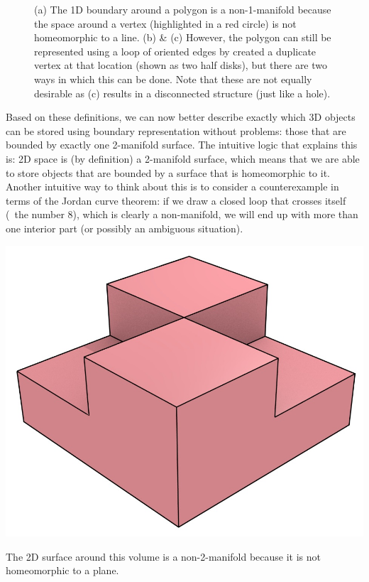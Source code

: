 \begin{figure}
\begin{subfigure}[b]{0.3\linewidth}
\caption{}%
\label{subfig:nonmanifold-2}
\end{subfigure}
\caption{(a) The 1D boundary around a polygon is a non-1-manifold because the space around a vertex (highlighted in a red circle) is not homeomorphic to a line. (b) \& (c) However, the polygon can still be represented using a loop of oriented edges by created a duplicate vertex at that location (shown as two half disks), but there are two ways in which this can be done.
Note that these are not equally desirable as (c) results in a disconnected structure (just like a hole).}%
\label{fig:nonmanifold}
\end{figure}

Based on these definitions, we can now better describe exactly which 3D objects can be stored using boundary representation without problems: those that are bounded by exactly one 2-manifold surface.
The intuitive logic that explains this is: 2D space is (by definition) a 2-manifold surface, which means that we are able to store objects that are bounded by a surface that is homeomorphic to it.
Another intuitive way to think about this is to consider a counterexample in terms of the Jordan curve theorem: if we draw a closed loop that crosses itself (\eg\ the number 8), which is clearly a non-manifold, we will end up with more than one interior part (or possibly an ambiguous situation).

\begin{marginfigure}
\centering
\includegraphics[width=\linewidth]{figs/non2manifold.jpg}
\caption{The 2D surface around this volume is a non-2-manifold because it is not homeomorphic to a plane.}%
\label{fig:non2manifold}
\end{marginfigure}

